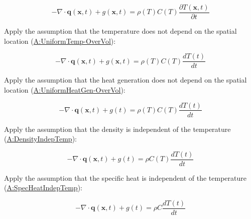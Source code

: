 \documentclass[12pt]{article}
\begin{document}
\begin{displaymath}
-{\nabla \cdot \mathbf{q} (\mathbf{x}, t)} + g(\mathbf{x}, t) = \rho (T) C (T) \frac{\partial T(\mathbf{x}, t)}{\partial t}
\end{displaymath}

\noindent Apply the assumption that the temperature does not depend on the spatial
location (\hyperref[assumpUnifTemp]{A:UniformTemp-OverVol}):

\begin{displaymath}
-{\nabla \cdot \mathbf{q} (\mathbf{x}, t)} + g(\mathbf{x}, t) = \rho (T) C (T) \frac{dT(t)}{dt}
\end{displaymath}

\noindent Apply the assumption that the heat generation does not depend on the spatial
location (\hyperref[assumpUnifHeatGen]{A:UniformHeatGen-OverVol}):

\begin{displaymath}
-{\nabla \cdot \mathbf{q} (\mathbf{x}, t)} + g(t) = \rho (T) C (T) \frac{dT(t)}{dt}
\end{displaymath}

\noindent Apply the assumption that the density is independent of the temperature
(\hyperref[assumpDensIndepT]{A:DensityIndepTemp}):

\begin{displaymath}
-{\nabla \cdot \mathbf{q} (\mathbf{x}, t)} + g(t) = \rho C (T) \frac{dT(t)}{dt}
\end{displaymath}

\noindent Apply the assumption that the specific heat is independent of the temperature
(\hyperref[assumpSpecHeatIndepT]{A:SpecHeatIndepTemp}):

\begin{displaymath}
-{\nabla \cdot \mathbf{q} (\mathbf{x}, t)} + g(t) = \rho C \frac{dT(t)}{dt}
\end{displaymath}

\end{document}
